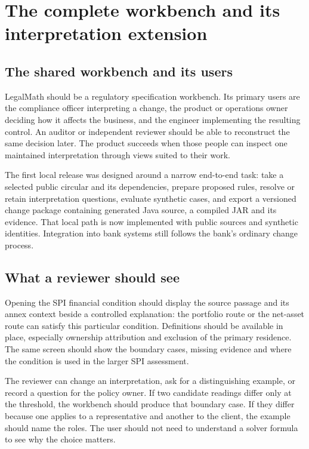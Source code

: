 \chapter{The complete workbench and its interpretation extension}
\label{ch:implementation}

\section{The shared workbench and its users}
\label{merge:P-03-product:00}

\label{sec:product}

LegalMath should be a regulatory specification workbench. Its primary users are
the compliance officer interpreting a change, the product or operations owner
deciding how it affects the business, and the engineer implementing the resulting
control. An auditor or independent reviewer should be able to reconstruct the
same decision later. The product succeeds when those people can inspect one
maintained interpretation through views suited to their work.

The first local release was designed around a narrow end-to-end task: take a selected public
circular and its dependencies, prepare proposed rules, resolve or retain
interpretation questions, evaluate synthetic cases, and export a versioned change
package containing generated Java source, a compiled JAR and its evidence.
That local path is now implemented with public sources and synthetic
identities. Integration into bank systems still follows the bank's ordinary
change process.

\section{What a reviewer should see}
\label{merge:P-03-product:01}


Opening the SPI financial condition should display the source passage and its
annex context beside a controlled explanation: the portfolio route or the
net-asset route can satisfy this particular condition. Definitions should be
available in place, especially ownership attribution and exclusion of the primary
residence. The same screen should show the boundary cases, missing evidence and
where the condition is used in the larger SPI assessment.

The reviewer can change an interpretation, ask for a distinguishing example, or
record a question for the policy owner. If two candidate readings differ only at
the threshold, the workbench should produce that boundary case. If they differ
because one applies to a representative and another to the client, the example
should name the roles. The user should not need to understand a solver formula
to see why the choice matters.

